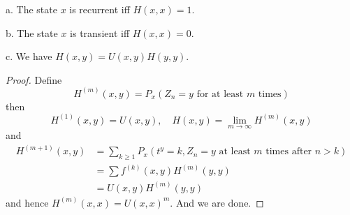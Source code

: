 \documentclass[lang=en, color=blue, ]{elegantbook}
\begin{document}
\begin{theorem}
    a. The state $x$ is recurrent iff $H(x,x) = 1$.\par
    b. The state $x$ is transient iff $H(x,x) = 0$.\par
    c. We have $H(x,y) = U(x,y)H(y,y)$.
\end{theorem}
\begin{proof}
    Define 
    \[H^{(m)}(x,y) = P_x(Z_n = y\text{ for at least }m\text{ times})\]
    then
    \[
    H^{(1)}(x,y) = U(x,y),\quad H(x,y) = \lim_{m\to\infty}H^{(m)}(x,y)
    \]
    and
    \[
    \begin{aligned}
    H^{(m+1)}(x,y) &= \sum_{k\geq 1}P_x(t^y = k, Z_n = y\text{ at least }m\text{ times after }n>k) \\ &= \sum\limits f^{(k)}(x,y)H^{(m)}(y,y) \\ &= U(x,y)H^{(m)}(y,y)
    \end{aligned}
    \]
    and hence $H^{(m)}(x,x) = U(x,x)^m$. And we are done.
\end{proof}
\end{document}
